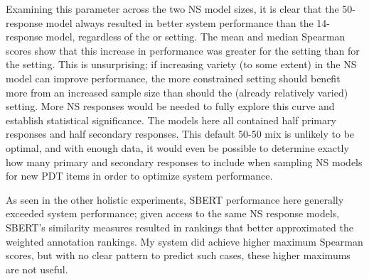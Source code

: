 Examining this parameter across the two NS model sizes, it is clear that the 50-response model always resulted in better system performance than the 14-response model, regardless of the  or  setting. The mean and median Spearman scores show that this increase in performance was greater for the  setting than for the  setting. This is unsurprising; if increasing variety (to some extent) in the NS model can improve performance, the more constrained  setting should benefit more from an increased sample size than should the (already relatively varied)  setting. More NS responses would be needed to fully explore this curve and establish statistical significance. The  models here all contained half primary responses and half secondary responses. This default 50-50 mix is unlikely to be optimal, and with enough data, it would even be possible to determine exactly how many primary and secondary responses to include when sampling NS models for new PDT items in order to optimize system performance.

As seen in the other holistic experiments, SBERT performance here generally exceeded system performance; given access to the same NS response models, SBERT's similarity measures resulted in rankings that better approximated the weighted annotation rankings. My system did achieve higher maximum Spearman scores, but with no clear pattern to predict such cases, these higher maximums are not useful.

